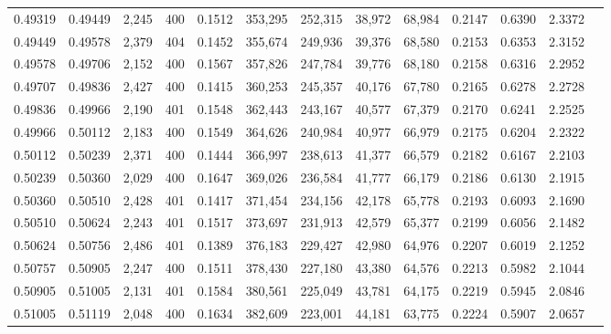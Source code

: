 \begin{tabular}{rrrrrrrrrrrrr}
0.49319 & 0.49449 & 2,245 & 400 &                                     0.1512 & 353,295 & 252,315 &  38,972 &  68,984 & 0.2147 & 0.6390 & 2.3372 \\
0.49449 & 0.49578 & 2,379 & 404 &                                     0.1452 & 355,674 & 249,936 &  39,376 &  68,580 & 0.2153 & 0.6353 & 2.3152 \\
0.49578 & 0.49706 & 2,152 & 400 &                                     0.1567 & 357,826 & 247,784 &  39,776 &  68,180 & 0.2158 & 0.6316 & 2.2952 \\
0.49707 & 0.49836 & 2,427 & 400 &                                     0.1415 & 360,253 & 245,357 &  40,176 &  67,780 & 0.2165 & 0.6278 & 2.2728 \\
0.49836 & 0.49966 & 2,190 & 401 &                                     0.1548 & 362,443 & 243,167 &  40,577 &  67,379 & 0.2170 & 0.6241 & 2.2525 \\
0.49966 & 0.50112 & 2,183 & 400 &                                     0.1549 & 364,626 & 240,984 &  40,977 &  66,979 & 0.2175 & 0.6204 & 2.2322 \\
0.50112 & 0.50239 & 2,371 & 400 &                                     0.1444 & 366,997 & 238,613 &  41,377 &  66,579 & 0.2182 & 0.6167 & 2.2103 \\
0.50239 & 0.50360 & 2,029 & 400 &                                     0.1647 & 369,026 & 236,584 &  41,777 &  66,179 & 0.2186 & 0.6130 & 2.1915 \\
0.50360 & 0.50510 & 2,428 & 401 &                                     0.1417 & 371,454 & 234,156 &  42,178 &  65,778 & 0.2193 & 0.6093 & 2.1690 \\
0.50510 & 0.50624 & 2,243 & 401 &                                     0.1517 & 373,697 & 231,913 &  42,579 &  65,377 & 0.2199 & 0.6056 & 2.1482 \\
0.50624 & 0.50756 & 2,486 & 401 &                                     0.1389 & 376,183 & 229,427 &  42,980 &  64,976 & 0.2207 & 0.6019 & 2.1252 \\
0.50757 & 0.50905 & 2,247 & 400 &                                     0.1511 & 378,430 & 227,180 &  43,380 &  64,576 & 0.2213 & 0.5982 & 2.1044 \\
0.50905 & 0.51005 & 2,131 & 401 &                                     0.1584 & 380,561 & 225,049 &  43,781 &  64,175 & 0.2219 & 0.5945 & 2.0846 \\
0.51005 & 0.51119 & 2,048 & 400 &                                     0.1634 & 382,609 & 223,001 &  44,181 &  63,775 & 0.2224 & 0.5907 & 2.0657 \\

\end{tabular}
